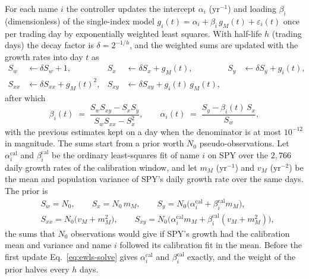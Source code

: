 For each name $i$ the controller updates the intercept $\alpha_i$ ($\mathrm{yr}^{-1}$) and loading $\beta_i$
(dimensionless) of the single-index model $g_i(t) = \alpha_i + \beta_i\,g_M(t) + \varepsilon_i(t)$ once per
trading day by exponentially weighted least squares. With half-life $h$ (trading days) the decay factor is
$\delta = 2^{-1/h}$, and the weighted sums are updated with the growth rates into day $t$ as
\begin{equation}
  \begin{aligned}
    S_w &\leftarrow \delta S_w + 1, &
    S_x &\leftarrow \delta S_x + g_M(t), &
    S_y &\leftarrow \delta S_y + g_i(t),\\
    S_{xx} &\leftarrow \delta S_{xx} + g_M(t)^2, &
    S_{xy} &\leftarrow \delta S_{xy} + g_i(t)\,g_M(t), & &
  \end{aligned}
  \label{eq:ewls-update}
\end{equation}
after which
\begin{equation}
  \beta_i(t) \;=\; \frac{S_w S_{xy} - S_x S_y}{S_w S_{xx} - S_x^2},
  \qquad
  \alpha_i(t) \;=\; \frac{S_y - \beta_i(t)\,S_x}{S_w},
  \label{eq:ewls-solve}
\end{equation}
with the previous estimates kept on a day when the denominator is at most $10^{-12}$ in magnitude. The sums start
from a prior worth $N_0$ pseudo-observations. Let $\alpha_i^{\mathrm{cal}}$ and $\beta_i^{\mathrm{cal}}$ be the
ordinary least-squares fit of name $i$ on SPY over the $2{,}766$ daily growth rates of the calibration window, and
let $m_M$ ($\mathrm{yr}^{-1}$) and $v_M$ ($\mathrm{yr}^{-2}$) be the mean and population variance of SPY's daily
growth rate over the same days. The prior is
\begin{equation}
  \begin{aligned}
    &S_w = N_0, \qquad S_x = N_0\,m_M, \qquad
    S_y = N_0\big(\alpha_i^{\mathrm{cal}} + \beta_i^{\mathrm{cal}} m_M\big),\\
    &S_{xx} = N_0\big(v_M + m_M^2\big), \qquad
    S_{xy} = N_0\big(\alpha_i^{\mathrm{cal}} m_M + \beta_i^{\mathrm{cal}}(v_M + m_M^2)\big),
  \end{aligned}
  \label{eq:ewls-prior}
\end{equation}
the sums that $N_0$ observations would give if SPY's growth had the calibration mean and variance and name $i$
followed its calibration fit in the mean. Before the first update Eq.~\eqref{eq:ewls-solve} gives
$\alpha_i^{\mathrm{cal}}$ and $\beta_i^{\mathrm{cal}}$ exactly, and the weight of the prior halves every $h$ days.
